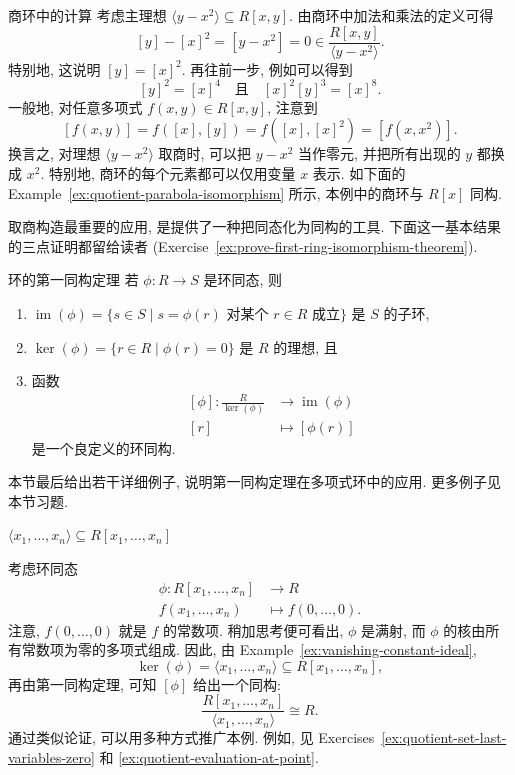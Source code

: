 \begin{Example}{商环中的计算}\label{ex:quotient-parabola-computations}
  考虑主理想 $\langle y-x^{2}\rangle\subseteq R[x,y]$. 由商环中加法和乘法的定义可得
  \[
    [y]-[x]^{2}=[y-x^{2}]=0\in\frac{R[x,y]}{\langle y-x^{2}\rangle}.
  \]
  特别地, 这说明 $[y]=[x]^{2}$. 再往前一步, 例如可以得到
  \[
    [y]^{2}=[x]^{4}\quad\text{且}\quad[x]^{2}[y]^{3}=[x]^{8}.
  \]
  一般地, 对任意多项式 $f(x,y)\in R[x,y]$, 注意到
  \[
    [f(x,y)]=f([x],[y])=f([x],[x]^{2})=[f(x,x^{2})].
  \]
  换言之, 对理想 $\langle y-x^{2}\rangle$ 取商时, 可以把 $y-x^{2}$ 当作零元, 并把所有出现的 $y$ 都换成 $x^{2}$. 特别地, 商环的每个元素都可以仅用变量 $x$ 表示. 如下面的 Example~\ref{ex:quotient-parabola-isomorphism} 所示, 本例中的商环与 $R[x]$ 同构.
\end{Example}

取商构造最重要的应用, 是提供了一种把同态化为同构的工具. 下面这一基本结果的三点证明都留给读者 (Exercise~\ref{ex:prove-first-ring-isomorphism-theorem}).

\begin{Theorem}{环的第一同构定理}\label{thm:first-isomorphism-theorem-for-rings}
  若 $\phi:R\to S$ 是环同态, 则
  \begin{enumerate}[label=(\roman*)]
    \item $\operatorname{im}(\phi)=\{s\in S\mid s=\phi(r)\text{ 对某个 }r\in R\text{ 成立}\}$ 是 $S$ 的子环,
    \item $\ker(\phi)=\{r\in R\mid\phi(r)=0\}$ 是 $R$ 的理想, 且
    \item 函数
      \[
        \begin{aligned}
          [\phi]:\frac{R}{\ker(\phi)}&\to\operatorname{im}(\phi)\\
          [r]&\mapsto[\phi(r)]
        \end{aligned}
      \]
      是一个良定义的环同构.
  \end{enumerate}
\end{Theorem}

本节最后给出若干详细例子, 说明第一同构定理在多项式环中的应用. 更多例子见本节习题.

\begin{Example}{{\textmd{$\langle x_{1},\ldots,x_{n}\rangle\subseteq R[x_{1},\ldots,x_{n}]$}}}
  \leavevmode\label{ex:quotient-evaluation-origin}\strut\par\nopagebreak[4]\noindent
  考虑环同态
  \[
    \begin{aligned}
      \phi:R[x_{1},\ldots,x_{n}]&\to R\\
      f(x_{1},\ldots,x_{n})&\mapsto f(0,\ldots,0).
    \end{aligned}
  \]
  注意, $f(0,\ldots,0)$ 就是 $f$ 的常数项. 稍加思考便可看出, $\phi$ 是满射, 而 $\phi$ 的核由所有常数项为零的多项式组成. 因此, 由 Example~\ref{ex:vanishing-constant-ideal},
  \[
    \ker(\phi)=\langle x_{1},\ldots,x_{n}\rangle\subseteq R[x_{1},\ldots,x_{n}],
  \]
  再由第一同构定理, 可知 $[\phi]$ 给出一个同构:
  \[
    \frac{R[x_{1},\ldots,x_{n}]}{\langle x_{1},\ldots,x_{n}\rangle}\cong R.
  \]
  通过类似论证, 可以用多种方式推广本例. 例如, 见 Exercises~\ref{ex:quotient-set-last-variables-zero} 和 \ref{ex:quotient-evaluation-at-point}.
\end{Example}


